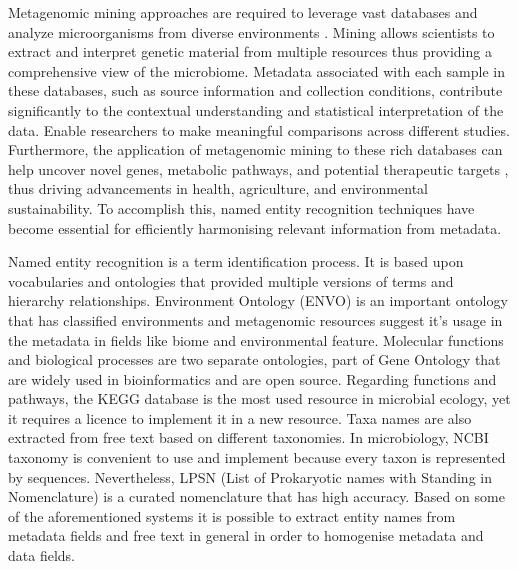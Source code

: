 Metagenomic mining approaches are required to leverage vast databases and analyze
microorganisms from diverse environments \parencite{delmont2011metagenomic}.
Mining allows scientists to extract and interpret genetic material 
from multiple resources thus providing a comprehensive view of the microbiome.
Metadata associated with each sample in these databases, such as source information and collection conditions,
contribute significantly to the contextual understanding and statistical interpretation of the data.
Enable researchers to make meaningful comparisons across different studies.
Furthermore, the application of metagenomic mining to these rich databases can help
uncover novel genes, metabolic pathways, and potential therapeutic targets \parencite{ma2023a-genomic},
thus driving advancements in health, agriculture, and environmental sustainability.
To accomplish this, named entity recognition techniques have become essential for
efficiently harmonising relevant information from metadata.

Named entity recognition is a term identification process. It is based upon
vocabularies and ontologies that provided multiple versions of terms and 
hierarchy relationships. Environment Ontology (ENVO) \parencite{buttigieg2016environment} 
is an important ontology that has classified environments and metagenomic 
resources suggest it's usage in the metadata in fields like biome and 
environmental feature. Molecular functions and biological processes are two separate 
ontologies, part of Gene Ontology \parencite{ashburner2000gene, gene2021gene} that
are widely used in bioinformatics and are open source. 
Regarding functions and pathways, the KEGG database \parencite{kanehisa2000kegg} is the most used resource
in microbial ecology, yet it requires a licence to implement it in a new resource.
Taxa names are also extracted from free text based on different taxonomies. In microbiology,
NCBI taxonomy \parencite{schoch2020ncbi} is convenient to use and implement because every taxon 
is represented by sequences. Nevertheless, LPSN (List of Prokaryotic names with Standing in Nomenclature) \parencite{parte2020list}
is a curated nomenclature that has high accuracy. Based on some of the aforementioned 
systems it is possible to extract entity names from metadata fields and free text in general 
in order to homogenise metadata and data fields.


